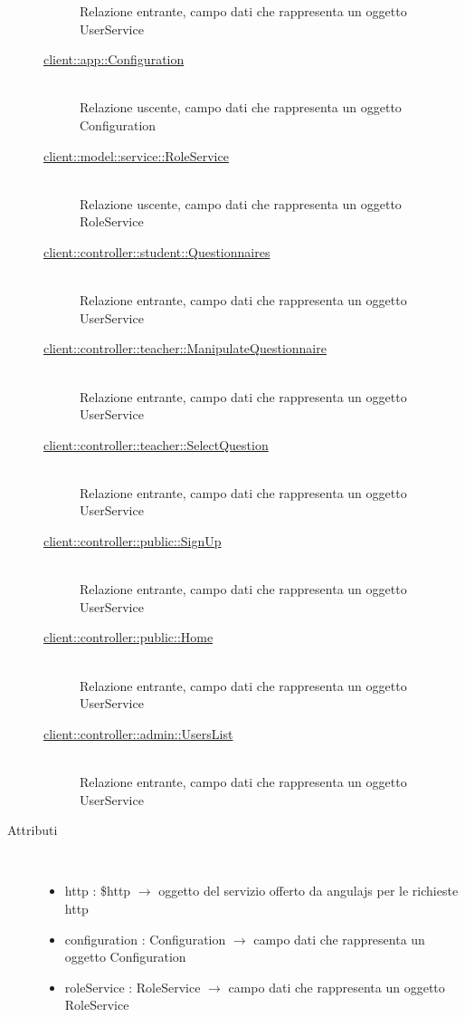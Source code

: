 \begin{description}
\begin{description}
	Relazione entrante, campo dati che rappresenta un oggetto UserService
	\item[\hyperlink{client::app::Configuration}{client::app::Configuration}] \hfill \\
	Relazione uscente, campo dati che rappresenta un oggetto Configuration
	\item[\hyperlink{client::model::service::RoleService}{client::model::service::RoleService}] \hfill \\
	Relazione uscente, campo dati che rappresenta un oggetto RoleService
	\item[\hyperlink{client::controller::student::Questionnaires}{client::controller::student::Questionnaires}] \hfill \\
	Relazione entrante, campo dati che rappresenta un oggetto UserService
	\item[\hyperlink{client::controller::teacher::ManipulateQuestionnaire}{client::controller::teacher::ManipulateQuestionnaire}] \hfill \\
	Relazione entrante, campo dati che rappresenta un oggetto UserService
	\item[\hyperlink{client::controller::teacher::SelectQuestion}{client::controller::teacher::SelectQuestion}] \hfill \\
	Relazione entrante, campo dati che rappresenta un oggetto UserService
	\item[\hyperlink{client::controller::public::SignUp}{client::controller::public::SignUp}] \hfill \\
	Relazione entrante, campo dati che rappresenta un oggetto UserService
	\item[\hyperlink{client::controller::public::Home}{client::controller::public::Home}] \hfill \\
	Relazione entrante, campo dati che rappresenta un oggetto UserService
	\item[\hyperlink{client::controller::admin::UsersList}{client::controller::admin::UsersList}] \hfill \\
	Relazione entrante, campo dati che rappresenta un oggetto UserService
\end{description}

\item[Attributi] \hfill \\
\vspace{-7mm}
\begin{itemize}
	\item http : \$http $\rightarrow$ oggetto del servizio offerto da angulajs per le richieste http
	\item configuration : Configuration $\rightarrow$ campo dati che rappresenta un oggetto Configuration
	\item roleService : RoleService $\rightarrow$ campo dati che rappresenta un oggetto RoleService
\end{itemize}


\end{description}
